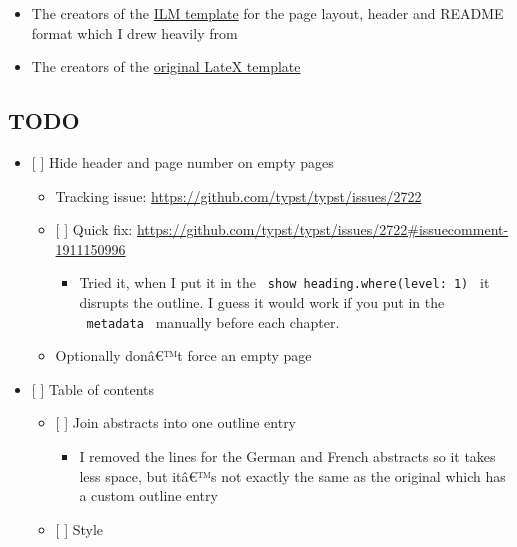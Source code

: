 \begin{itemize}
\tightlist
\item
  The creators of the
  \href{https://github.com/talal/ilm/blob/main/lib.typ}{ILM template}
  for the page layout, header and README format which I drew heavily
  from
\item
  The creators of the
  \href{https://www.overleaf.com/latex/templates/swiss-federal-institute-of-technology-in-lausanne-epfl-phd-thesis/dhcgtppybcwv}{original
  LateX template}
\end{itemize}

\subsection{TODO}\label{todo}

\begin{itemize}
\tightlist
\item
  {[} {]} Hide header and page number on empty pages

  \begin{itemize}
  \tightlist
  \item
    Tracking issue: \url{https://github.com/typst/typst/issues/2722}
  \item
    {[} {]} Quick fix:
    \url{https://github.com/typst/typst/issues/2722\#issuecomment-1911150996}

    \begin{itemize}
    \tightlist
    \item
      Tried it, when I put it in the
      \texttt{\ show\ heading.where(level:\ 1)\ } it disrupts the
      outline. I guess it would work if you put in the
      \texttt{\ metadata\ } manually before each chapter.
    \end{itemize}
  \item
    Optionally donâ€™t force an empty page
  \end{itemize}
\item
  {[} {]} Table of contents

  \begin{itemize}
  \tightlist
  \item
    {[} {]} Join abstracts into one outline entry

    \begin{itemize}
    \tightlist
    \item
      I removed the lines for the German and French abstracts so it
      takes less space, but itâ€™s not exactly the same as the original
      which has a custom outline entry
    \end{itemize}
  \item
    {[} {]} Style


\end{itemize}
\end{itemize}
